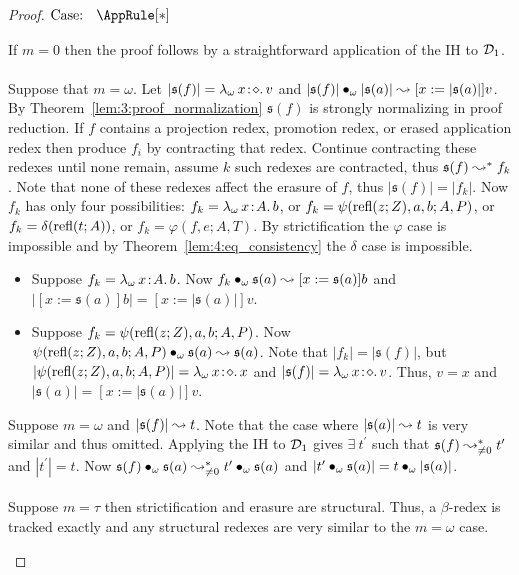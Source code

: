 \begin{proof}
    $\text{Case: }\begin{array}{c} \AppRule[*] \end{array}$
    \begin{proofcase}
        If $m = 0$ then the proof follows by a straightforward application of the IH to $\mathcal{D}_{1}$.
        \\ \\
        Suppose that $m = \omega$.
        Let $|\mathfrak{s}(f)| = {\lambda_\omega}\, x\! : \! \diamond.\, v$ and $|\mathfrak{s}(f)| \bullet_{\omega} |\mathfrak{s}(a)| \leadsto [x := |\mathfrak{s}(a)|]v$.
        By Theorem~\ref{lem:3:proof_normalization} $\mathfrak{s}(f)$ is strongly normalizing in proof reduction.
        If $f$ contains a projection redex, promotion redex, or erased application redex then produce $f_i$ by contracting that redex.
        Continue contracting these redexes until none remain, assume $k$ such redexes are contracted, thus $\mathfrak{s}(f) \leadsto^* f_k$.
        Note that none of these redexes affect the erasure of $f$, thus $|\mathfrak{s}(f)| = |f_k|$.
        Now $f_k$ has only four possibilities: $f_k = {\lambda_\omega}\, x\! : \! A.\, b$, or $f_k = \psi(\textnormal{refl}(z; Z), a, b; A, P)$, or $f_k = \delta(\textnormal{refl}(t; A))$, or $f_k = \varphi(f, e; A, T)$.
        By strictification the $\varphi$ case is impossible and by Theorem~\ref{lem:4:eq_consistency} the $\delta$ case is impossible.
        \begin{itemize}
            \item {
                Suppose $f_k = {\lambda_\omega}\, x\! : \! A.\, b$.
                Now $f_k \bullet_{\omega} \mathfrak{s}(a) \leadsto [x := \mathfrak{s}(a)]b$ and $|[x := \mathfrak{s}(a)]b| = [x := |\mathfrak{s}(a)|]v$.
            }
            \item {
                Suppose $f_k = \psi(\textnormal{refl}(z; Z), a, b; A, P)$.
                Now $\psi(\textnormal{refl}(z; Z), a, b; A, P) \bullet_{\omega} \mathfrak{s}(a) \leadsto \mathfrak{s}(a)$.
                Note that $|f_k| = |\mathfrak{s}(f)|$, but $|\psi(\textnormal{refl}(z; Z), a, b; A, P)| = {\lambda_\omega}\, x\! : \! \diamond.\, x$ and $|\mathfrak{s}(f)| = {\lambda_\omega}\, x\! : \! \diamond.\, v$.
                Thus, $v = x$ and $|\mathfrak{s}(a)| = [x := |\mathfrak{s}(a)|]v$.
            }
        \end{itemize}
        \vspace{.15in}
        Suppose $m = \omega$ and $|\mathfrak{s}(f)| \leadsto t$.
        Note that the case where $|\mathfrak{s}(a)| \leadsto t$ is very similar and thus omitted.
        Applying the IH to $\mathcal{D}_{1}$ gives $\exists\ t^\prime$ such that $\mathfrak{s}(f) \leadsto^*_{\neq 0} t^\prime$ and $|t^\prime| = t$.
        Now $\mathfrak{s}(f) \bullet_{\omega} \mathfrak{s}(a) \leadsto^*_{\neq 0} t^\prime \bullet_{\omega} \mathfrak{s}(a)$ and $|t^\prime \bullet_{\omega} \mathfrak{s}(a)| = t \bullet_{\omega} |\mathfrak{s}(a)|$.
        \\ \\
        Suppose $m = \tau$ then strictification and erasure are structural.
        Thus, a $\beta$-redex is tracked exactly and any structural redexes are very similar to the $m = \omega$ case.
    \end{proofcase}


\end{proof}
